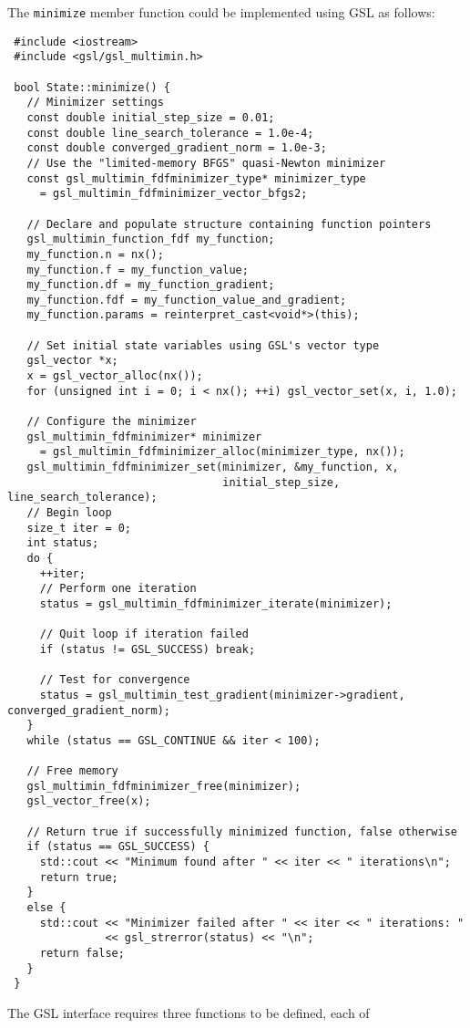 \documentclass[a4,oneside]{book}
\def\codesize{\small}
\def\code#1{{\codesize\texttt{#1}}}
\begin{document}
The \code{minimize} member function could be implemented using GSL as
follows:
%
\begin{lstlisting}
 #include <iostream>
 #include <gsl/gsl_multimin.h>

 bool State::minimize() {
   // Minimizer settings
   const double initial_step_size = 0.01;
   const double line_search_tolerance = 1.0e-4;
   const double converged_gradient_norm = 1.0e-3;
   // Use the "limited-memory BFGS" quasi-Newton minimizer
   const gsl_multimin_fdfminimizer_type* minimizer_type
     = gsl_multimin_fdfminimizer_vector_bfgs2;

   // Declare and populate structure containing function pointers
   gsl_multimin_function_fdf my_function;
   my_function.n = nx();
   my_function.f = my_function_value;
   my_function.df = my_function_gradient;
   my_function.fdf = my_function_value_and_gradient;
   my_function.params = reinterpret_cast<void*>(this);
   
   // Set initial state variables using GSL's vector type
   gsl_vector *x;
   x = gsl_vector_alloc(nx());
   for (unsigned int i = 0; i < nx(); ++i) gsl_vector_set(x, i, 1.0);

   // Configure the minimizer
   gsl_multimin_fdfminimizer* minimizer
     = gsl_multimin_fdfminimizer_alloc(minimizer_type, nx());
   gsl_multimin_fdfminimizer_set(minimizer, &my_function, x,
                                 initial_step_size, line_search_tolerance);
   // Begin loop
   size_t iter = 0;
   int status;
   do {
     ++iter;
     // Perform one iteration
     status = gsl_multimin_fdfminimizer_iterate(minimizer);

     // Quit loop if iteration failed
     if (status != GSL_SUCCESS) break;
    
     // Test for convergence
     status = gsl_multimin_test_gradient(minimizer->gradient, converged_gradient_norm);
   }
   while (status == GSL_CONTINUE && iter < 100);

   // Free memory
   gsl_multimin_fdfminimizer_free(minimizer);
   gsl_vector_free(x);

   // Return true if successfully minimized function, false otherwise
   if (status == GSL_SUCCESS) {
     std::cout << "Minimum found after " << iter << " iterations\n";
     return true;
   }
   else {
     std::cout << "Minimizer failed after " << iter << " iterations: "
               << gsl_strerror(status) << "\n";
     return false;
   }
 }
\end{lstlisting}
%
The GSL interface requires three functions to be defined, each of
\end{document}
